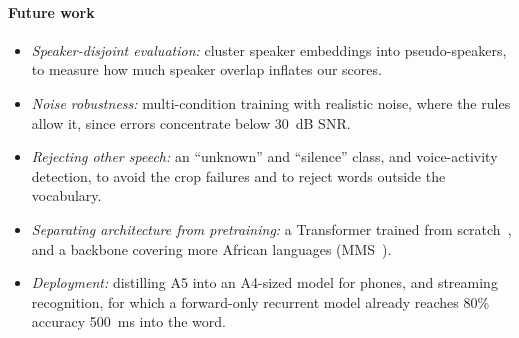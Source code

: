 \paragraph{Future work}
\begin{itemize}
  \item \emph{Speaker-disjoint evaluation:} cluster speaker embeddings into pseudo-speakers, to measure how much
        speaker overlap inflates our scores.
  \item \emph{Noise robustness:} multi-condition training with realistic noise, where the rules allow it, since
        errors concentrate below 30~dB SNR.
  \item \emph{Rejecting other speech:} an ``unknown'' and ``silence'' class, and voice-activity detection, to avoid
        the crop failures and to reject words outside the vocabulary.
  \item \emph{Separating architecture from pretraining:} a Transformer trained from scratch~\cite{berg2021keyword},
        and a backbone covering more African languages (MMS~\cite{pratap2024scaling}).
  \item \emph{Deployment:} distilling A5 into an A4-sized model for phones, and streaming recognition, for which a
        forward-only recurrent model already reaches 80\% accuracy 500~ms into the word.
\end{itemize}
